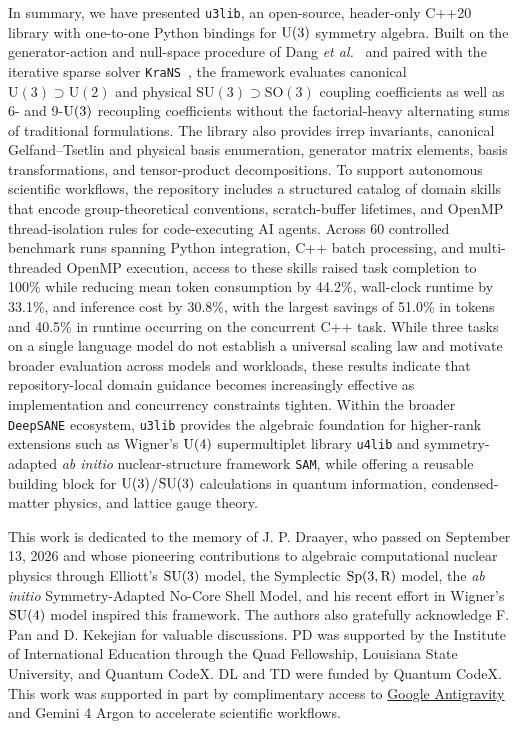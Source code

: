 \documentclass[aps,onecolumn,10pt,superscriptaddress,floatfix,nofootinbib]{revtex4}
\begin{document}
In summary, we have presented \texttt{u3lib}, an open-source, header-only C++20 library with one-to-one Python bindings for $\rm U(3)$ symmetry algebra. Built on the generator-action and null-space procedure of Dang \textit{et al.}~\cite{Dang2024EPJP1} and paired with the iterative sparse solver \texttt{KraNS}~\cite{Krastenov2026MSc}, the framework evaluates canonical $\mathrm{U(3)}\supset\mathrm{U(2)}$ and physical $\mathrm{SU(3)}\supset\mathrm{SO(3)}$ coupling coefficients as well as 6- and 9-$\rm U(3)$ recoupling coefficients without the factorial-heavy alternating sums of traditional formulations. The library also provides irrep invariants, canonical Gelfand--Tsetlin and physical basis enumeration, generator matrix elements, basis transformations, and tensor-product decompositions. To support autonomous scientific workflows, the repository includes a structured catalog of domain skills that encode group-theoretical conventions, scratch-buffer lifetimes, and OpenMP thread-isolation rules for code-executing AI agents. Across 60 controlled benchmark runs spanning Python integration, C++ batch processing, and multi-threaded OpenMP execution, access to these skills raised task completion to 100\% while reducing mean token consumption by 44.2\%, wall-clock runtime by 33.1\%, and inference cost by 30.8\%, with the largest savings of 51.0\% in tokens and 40.5\% in runtime occurring on the concurrent C++ task. While three tasks on a single language model do not establish a universal scaling law and motivate broader evaluation across models and workloads, these results indicate that repository-local domain guidance becomes increasingly effective as implementation and concurrency constraints tighten. Within the broader \texttt{DeepSANE} ecosystem, \texttt{u3lib} provides the algebraic foundation for higher-rank extensions such as Wigner's $\rm U(4)$ supermultiplet library \texttt{u4lib} and symmetry-adapted \textit{ab initio} nuclear-structure framework \texttt{SAM}, while offering a reusable building block for $\rm U(3)$/$\rm SU(3)$ calculations in quantum information, condensed-matter physics, and lattice gauge theory.

\begin{acknowledgments}
This work is dedicated to the memory of J. P. Draayer, who passed on September 13, 2026 and whose pioneering contributions to algebraic computational nuclear physics through Elliott's $\rm SU(3)$ model, the Symplectic $\rm Sp(3,R)$ model, the \textit{ab initio} Symmetry-Adapted No-Core Shell Model, and his recent effort in Wigner's $\rm SU(4)$ model inspired this framework. The authors also gratefully acknowledge F. Pan and D. Kekejian for valuable discussions. PD was supported by the Institute of International Education through the Quad Fellowship, Louisiana State University, and Quantum CodeX. DL and TD were funded by Quantum CodeX. This work was supported in part by complimentary access to \href{https://antigravity.google/use-cases/science}{Google Antigravity} and Gemini 4 Argon to accelerate scientific workflows.
\end{acknowledgments}
\end{document}
